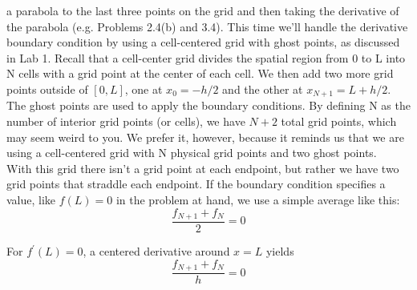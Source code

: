 \documentclass{book}
\theoremstyle{plain}
\theoremstyle{definition}
\numberwithin{exm}{chapter}
\theoremstyle{remark}
\theoremstyle{summary}
\theoremstyle{overview}
\begin{document}
a parabola to the last three points on the grid and then taking the derivative of
the parabola (e.g. Problems 2.4(b) and 3.4). This time we\rq ll handle the derivative
boundary condition by using a cell-centered grid with ghost points, as discussed
in Lab 1. Recall that a cell-center grid divides the spatial region from 0 to L into
N cells with a grid point at the center of each cell. We then add two more grid
points outside of $[0,L]$, one at $x_0  = −h/2$ and the other at $x_{N+1} = L + h/2$. The
ghost points are used to apply the boundary conditions. By defining N as the
number of interior grid points (or cells), we have $N +2$ total grid points, which
may seem weird to you. We prefer it, however, because it reminds us that we are
using a cell-centered grid with N physical grid points and two ghost points. \\
With this grid there isn\rq t a grid point at each endpoint, but rather we have two
grid points that straddle each endpoint. If the boundary condition specifies a
value, like $f (L) = 0 $ in the problem at hand, we use a simple average like this:
\begin{equation}\label{eq:46}
		\frac{f_{N+1} + f_N}{2}=0
				\end{equation}	

For $f^\prime (L) = 0$, a centered derivative around $x = L$ yields
\begin{equation}\label{eq:47}
		\frac{f_{N+1} + f_N}{h}=0
				\end{equation}	
\end{document}
